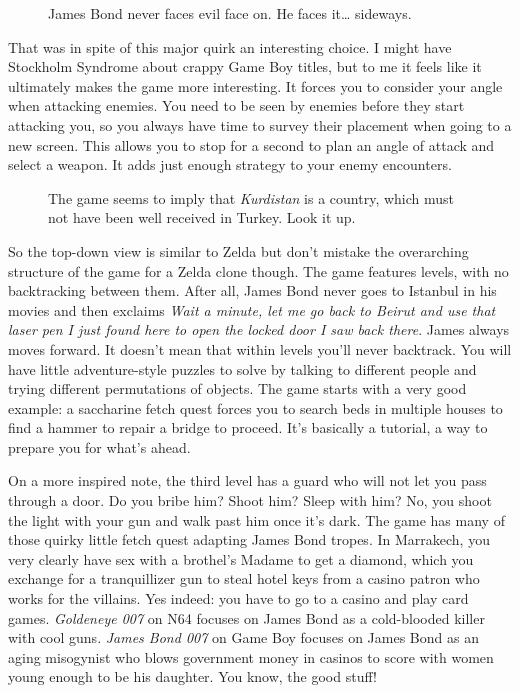 \documentclass{book}
\begin{document}
\FloatBarrier\vspace{\baselineskip}\begin{figure}[H]\caption*{James Bond never faces evil face on. He faces it… sideways.}\end{figure}
That was in spite of this major quirk an interesting choice. I might have Stockholm Syndrome about crappy Game Boy titles, but to me it feels like it ultimately makes the game more interesting. It forces you to consider your angle when attacking enemies. You need to be seen by enemies before they start attacking you, so you always have time to survey their placement when going to a new screen. This allows you to stop for a second to plan an angle of attack and select a weapon. It adds just enough strategy to your enemy encounters.\par
\FloatBarrier\vspace{\baselineskip}\begin{figure}[H]\caption*{The game seems to imply that \emph{Kurdistan} is a country, which must not have been well received in Turkey. Look it up.}\end{figure}
So the top-down view is similar to Zelda but don’t mistake the overarching structure of the game for a Zelda clone though. The game features levels, with no backtracking between them. After all, James Bond never goes to Istanbul in his movies and then exclaims \emph{Wait a minute, let me go back to Beirut and use that laser pen I just found here to open the locked door I saw back there}. James always moves forward. It doesn’t mean that within levels you’ll never backtrack. You will have little adventure-style puzzles to solve by talking to different people and trying different permutations of objects. The game starts with a very good example: a saccharine fetch quest forces you to search beds in multiple houses to find a hammer to repair a bridge to proceed. It’s basically a tutorial, a way to prepare you for what’s ahead.\par
\FloatBarrier\vspace{\baselineskip}\begin{figure}[H]\end{figure}
On a more inspired note, the third level has a guard who will not let you pass through a door. Do you bribe him? Shoot him? Sleep with him? No, you shoot the light with your gun and walk past him once it’s dark. The game has many of those quirky little fetch quest adapting James Bond tropes. In Marrakech, you very clearly have sex with a brothel’s Madame to get a diamond, which you exchange for a tranquillizer gun to steal hotel keys from a casino patron who works for the villains. Yes indeed: you have to go to a casino and play card games. \emph{Goldeneye 007} on N64 focuses on James Bond as a cold-blooded killer with cool guns. \emph{James Bond 007} on Game Boy focuses on James Bond as an aging misogynist who blows government money in casinos to score with women young enough to be his daughter. You know, the good stuff!\par
\end{document}
